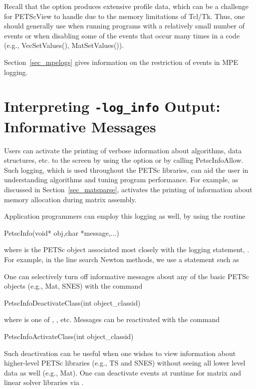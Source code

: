 {{Recall that the option  produces extensive profile
data, which can be a challenge for PETScView to handle due to
the memory limitations of Tcl/Tk.  Thus, one should generally use
 when running programs with a relatively small
number of events or when disabling some of the events that occur many
times in a code (e.g., VecSetValues(), MatSetValues()).

Section~\ref{sec_mpelogs} gives information on the restriction of events
in MPE logging.


\section{Interpreting {\tt -log\_info} Output: Informative Messages}
\label{sec_PetscLoginfo}

Users can activate the printing of verbose information about
algorithms, data structures, etc. to the screen by using the option   or by calling PetscInfoAllow.
Such logging, which is used throughout the PETSc libraries,
can aid the user in understanding algorithms and
tuning program performance.  For example, as discussed in
Section~\ref{sec_matsparse},  activates the
printing of information about memory allocation during
matrix assembly.

Application programmers can employ this logging as well, by
using the routine
\begin{tabbing}
   PetscInfo(void* obj,char *message,...)
\end{tabbing}
where  is the PETSc object associated most closely with
the logging statement, .
For example, in the line search Newton methods, we use a statement such as

One can selectively turn off informative messages about any of the
basic PETSc objects (e.g., Mat, SNES) with the command
\begin{tabbing}
   PetscInfoDeactivateClass(int object\_classid)
\end{tabbing}
where
 is one of , , etc.
Messages can be reactivated with the command
\begin{tabbing}
   PetscInfoActivateClass(int object\_classid)
\end{tabbing}
Such deactivation can be useful when one wishes to view information
about higher-level PETSc libraries (e.g., TS and SNES) without
seeing all lower level data as well (e.g., Mat).  One can deactivate
events at runtime for matrix and linear solver libraries via .

}}
